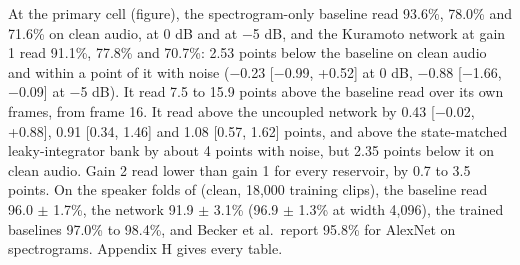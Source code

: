\documentclass[10pt]{article}
\begin{document}
At the primary cell (figure), the spectrogram-only baseline read 93.6\%,
78.0\% and 71.6\% on clean audio, at 0 dB and at \ensuremath{-}5 dB, and
the Kuramoto network at gain 1 read 91.1\%, 77.8\% and 70.7\%: 2.53
points below the baseline on clean audio and within a point of it with
noise (\ensuremath{-}0.23 {[}\ensuremath{-}0.99, +0.52{]} at 0 dB,
\ensuremath{-}0.88 {[}\ensuremath{-}1.66, \ensuremath{-}0.09{]} at
\ensuremath{-}5 dB). It read 7.5 to 15.9 points above the baseline read
over its own frames, from frame 16. It read above the uncoupled network
by 0.43 {[}\ensuremath{-}0.02, +0.88{]}, 0.91 {[}0.34, 1.46{]} and 1.08
{[}0.57, 1.62{]} points, and above the state-matched leaky-integrator
bank by about 4 points with noise, but 2.35 points below it on clean
audio. Gain 2 read lower than gain 1 for every reservoir, by 0.7 to 3.5
points. On the speaker folds of \citet{becker2024} (clean, 18,000
training clips), the baseline read 96.0 \ensuremath{\pm} 1.7\%, the
network 91.9 \ensuremath{\pm} 3.1\% (96.9 \ensuremath{\pm} 1.3\% at
width 4,096), the trained baselines 97.0\% to 98.4\%, and Becker et
al.~report 95.8\% for AlexNet on spectrograms. Appendix H gives every
table.
\end{document}
